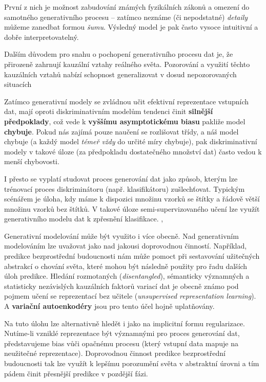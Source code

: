 První z nich je možnost zabudování známých fyzikálních zákonů a omezení do samotného generativního procesu – 
zatímco neznáme (či nepodstatné) \emph{detaily} můžeme zanedbat formou \emph{šumu}. 
Výsledný model je pak často vysoce intuitivní a dobře interpretovatelný. \cite{Goodfellow2016}

Dalším důvodem pro snahu o pochopení generativního procesu dat je, že přirozeně zahrnují kauzální vztahy reálného světa.
Pozorování a využití těchto kauzálních vztahů nabízí schopnost generalizovat v dosud nepozorovaných situacích  \cite{Goodfellow2016}

Zatímco generativní modely se zvládnou učit efektivní reprezentace vstupních dat, mají oproti diskriminativním modelům tendenci činit \textbf{silnější předpoklady}, což vede k \textbf{vyššímu asymptotickému biasu} pakliže model \textbf{chybuje}. \cite{Banerjee2007}
Pokud nás zajímá pouze naučení se rozlišovat třídy, a náš model chybuje (a každý model \emph{témeř vždy} do určité míry chybuje), pak diskriminativní modely v takové úloze (za předpokladu dostatečného množství dat) často vedou k menší chybovosti.  \cite{Goodfellow2016}

I přesto se vyplatí studovat proces generování dat jako způsob, kterým lze trénovací proces diskriminátoru (např. klasifikátoru) zušlechťovat.
Typickým scénářem je úloha, kdy máme k dispozici množinu vzorků se štítky a řádově větší množinu vzorků bez štítků.
V takové úloze semi-supervizovaného učení lze využít generativního modelu dat k zpřesnění klasifikace. \cite{Kingma2014}, \cite{Soenderby2016}

Generativní modelování může být využito i více obecně. Nad generativním modelováním lze uvažovat jako nad jakousi doprovodnou činností.
Například, predikce bezprostřední budoucnosti nám může pomoct při sestavování užitečných abstrakcí o chování světa, které mohou být následně použity pro řadu dalších úloh predikce.
Hledání rozmotaných (\emph{disentangled}), sémanticky významných a statisticky nezávislých kauzálních faktorů variací dat je obecně známo pod pojmem učení se reprezentací bez učitele (\emph{unsupervised representation learning}).
A \textbf{variační autoenkodéry} jsou pro tento účel hojně uplatňovány. \cite{Goodfellow2016}

Na tuto úlohu lze alternativně hledět i jako na implicitní formu regularizace. Nutíme-li vzniklé reprezentace být významnými pro proces generování dat, představujeme bias vůči opačnému procesu (který vstupní data mapuje na neužitečné reprezentace).
Doprovodnou činnost predikce bezprostřední budoucnosti tak lze využít k lepšímu porozumění světa v abstraktní úrovni a tím pádem činit přesnější predikce v pozdější fázi. \cite{Goodfellow2016}

